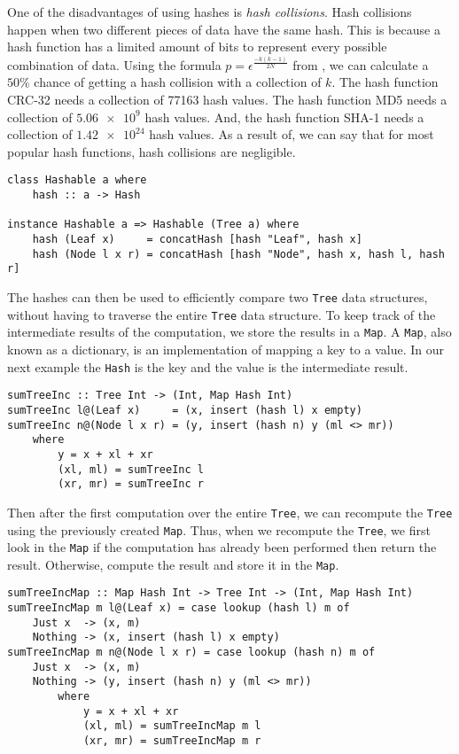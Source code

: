 One of the disadvantages of using hashes is \textit{hash collisions}. Hash collisions happen when two different pieces of data have the same hash. This is because a hash function has a limited amount of bits to represent every possible combination of data. Using the formula $p = \epsilon^{\frac{-k(k-1)}{2N}}$ from \cite{hashcoll2011}, we can calculate a $50\%$ chance of getting a hash collision with a collection of $k$. The hash function CRC-32 needs a collection of 77163 hash values. The hash function MD5 needs a collection of $\num{5.06e9}$ hash values. And, the hash function SHA-1 needs a collection of $\num{1.42e24}$ hash values. As a result of, we can say that for most popular hash functions, hash collisions are negligible.

\begin{verbatim}
class Hashable a where
    hash :: a -> Hash

instance Hashable a => Hashable (Tree a) where
    hash (Leaf x)     = concatHash [hash "Leaf", hash x]
    hash (Node l x r) = concatHash [hash "Node", hash x, hash l, hash r]
\end{verbatim}

The hashes can then be used to efficiently compare two \texttt{Tree} data structures, without having to traverse the entire \texttt{Tree} data structure. To keep track of the intermediate results of the computation, we store the results in a \texttt{Map}. A \texttt{Map}, also known as a dictionary, is an implementation of mapping a key to a value. In our next example the \texttt{Hash} is the key and the value is the intermediate result.

\begin{verbatim}
sumTreeInc :: Tree Int -> (Int, Map Hash Int)
sumTreeInc l@(Leaf x)     = (x, insert (hash l) x empty)
sumTreeInc n@(Node l x r) = (y, insert (hash n) y (ml <> mr))
    where
        y = x + xl + xr
        (xl, ml) = sumTreeInc l
        (xr, mr) = sumTreeInc r
\end{verbatim}

Then after the first computation over the entire \texttt{Tree}, we can recompute the \texttt{Tree} using the previously created \texttt{Map}. Thus, when we recompute the \texttt{Tree}, we first look in the \texttt{Map} if the computation has already been performed then return the result. Otherwise, compute the result and store it in the \texttt{Map}.

\begin{verbatim}
sumTreeIncMap :: Map Hash Int -> Tree Int -> (Int, Map Hash Int)
sumTreeIncMap m l@(Leaf x) = case lookup (hash l) m of
    Just x  -> (x, m) 
    Nothing -> (x, insert (hash l) x empty)
sumTreeIncMap m n@(Node l x r) = case lookup (hash n) m of
    Just x  -> (x, m)
    Nothing -> (y, insert (hash n) y (ml <> mr))
        where
            y = x + xl + xr
            (xl, ml) = sumTreeIncMap m l
            (xr, mr) = sumTreeIncMap m r
\end{verbatim}

